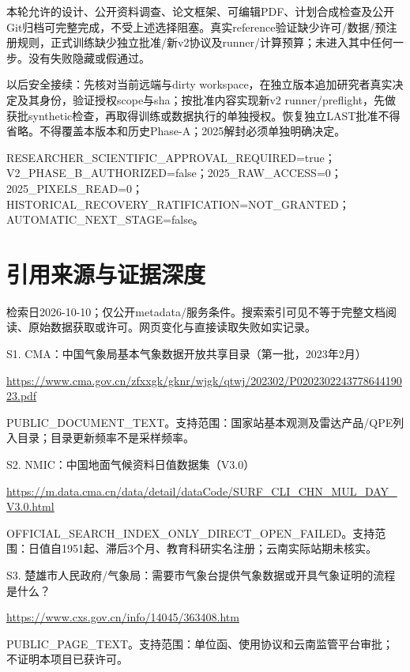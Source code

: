 \documentclass[UTF8,fontset=fandol,10pt]{ctexart}
\begin{document}
本轮允许的设计、公开资料调查、论文框架、可编辑PDF、计划合成检查及公开Git归档可完整完成，不受上述选择阻塞。真实reference验证缺少许可/\allowbreak{}数据/\allowbreak{}预注册规则，正式训练缺少独立批准/\allowbreak{}新v2协议及runner/\allowbreak{}计算预算；未进入其中任何一步。没有失败隐藏或假通过。

以后安全接续：先核对当前远端与dirty workspace，在独立版本追加研究者真实决定及其身份，验证授权scope与sha；按批准内容实现新v2 runner/\allowbreak{}preflight，先做获批synthetic检查，再取得训练或数据执行的单独授权。恢复独立LAST批准不得省略。不得覆盖本版本和历史Phase-A；2025解封必须单独明确决定。

RESEARCHER\_\allowbreak{}SCIENTIFIC\_\allowbreak{}APPROVAL\_\allowbreak{}REQUIRED=true；V2\_\allowbreak{}PHASE\_\allowbreak{}B\_\allowbreak{}AUTHORIZED=false；2025\_\allowbreak{}RAW\_\allowbreak{}ACCESS=0；2025\_\allowbreak{}PIXELS\_\allowbreak{}READ=0；HISTORICAL\_\allowbreak{}RECOVERY\_\allowbreak{}RATIFICATION=NOT\_\allowbreak{}GRANTED；AUTOMATIC\_\allowbreak{}NEXT\_\allowbreak{}STAGE=false。
\clearpage\section{引用来源与证据深度}

检索日2026-10-10；仅公开metadata/\allowbreak{}服务条件。搜索索引可见不等于完整文档阅读、原始数据获取或许可。网页变化与直接读取失败如实记录。

S1. CMA：中国气象局基本气象数据开放共享目录（第一批，2023年2月）\par\url{https://www.cma.gov.cn/zfxxgk/gknr/wjgk/qtwj/202302/P020230224377864419023.pdf}\par PUBLIC\_\allowbreak{}DOCUMENT\_\allowbreak{}TEXT。支持范围：国家站基本观测及雷达产品/\allowbreak{}QPE列入目录；目录更新频率不是采样频率。\par\medskip

S2. NMIC：中国地面气候资料日值数据集（V3.0）\par\url{https://m.data.cma.cn/data/detail/dataCode/SURF_CLI_CHN_MUL_DAY_V3.0.html}\par OFFICIAL\_\allowbreak{}SEARCH\_\allowbreak{}INDEX\_\allowbreak{}ONLY\_\allowbreak{}DIRECT\_\allowbreak{}OPEN\_\allowbreak{}FAILED。支持范围：日值自1951起、滞后3个月、教育科研实名注册；云南实际站期未核实。\par\medskip

S3. 楚雄市人民政府/\allowbreak{}气象局：需要市气象台提供气象数据或开具气象证明的流程是什么？\par\url{https://www.cxs.gov.cn/info/14045/363408.htm}\par PUBLIC\_\allowbreak{}PAGE\_\allowbreak{}TEXT。支持范围：单位函、使用协议和云南监管平台审批；不证明本项目已获许可。\par\medskip
\end{document}
